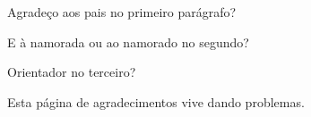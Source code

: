 \begin{agradecimentos}

Agradeço aos pais no primeiro parágrafo?

E à namorada ou ao namorado no segundo?

Orientador no terceiro?

Esta página de agradecimentos vive dando problemas.

\end{agradecimentos}